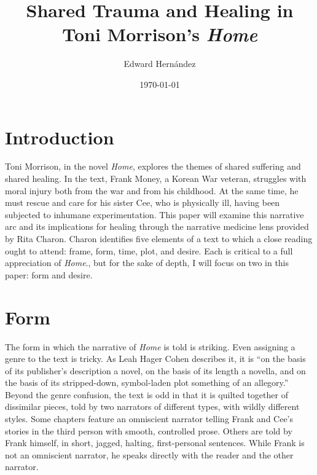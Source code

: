 \documentclass[12pt]{article}
\begin{document}
\title{Shared Trauma and Healing in Toni Morrison's \emph{Home}}
\author{Edward Hern\'{a}ndez}
\date{\today}

\maketitle


\vspace{12pt}

\section{Introduction}

Toni Morrison, in the novel \emph{Home}\autocite{Morrison12}, explores the
themes of shared suffering and shared healing. In the text, Frank Money, a
Korean War veteran, struggles with moral injury both from the war and from his
childhood. At the same time, he must rescue and care for his sister Cee, who is
physically ill, having been subjected to inhumane experimentation.  This paper
will examine this narrative arc and its implications for healing through the
narrative medicine lens provided by Rita Charon.\autocite[ch.~6]{Charon06}
Charon identifies five elements of a text to which a close reading ought to
attend: frame, form, time, plot, and desire. Each is critical to a full
appreciation of \emph{Home}., but for the sake of depth, I will focus on two in
this paper: form and desire.

\section{Form}

The form in which the narrative of \emph{Home} is told is striking. Even
assigning a genre to the text is tricky. As Leah Hager Cohen describes it, it
is ``on the basis of its publisher’s description a novel, on the basis of its
length a novella, and on the basis of its stripped-down, symbol-laden plot
something of an allegory.''\autocite{Cohen12} Beyond the genre confusion, the
text is odd in that it is quilted together of dissimilar pieces, told by two
narrators of different types, with wildly different styles. Some chapters
feature an omniscient narrator telling Frank and Cee's stories in the third
person with smooth, controlled prose. Others are told by Frank himself, in
short, jagged, halting, first-personal sentences. While Frank is not an
omniscient narrator, he speaks directly with the reader and the other narrator.
\end{document}
